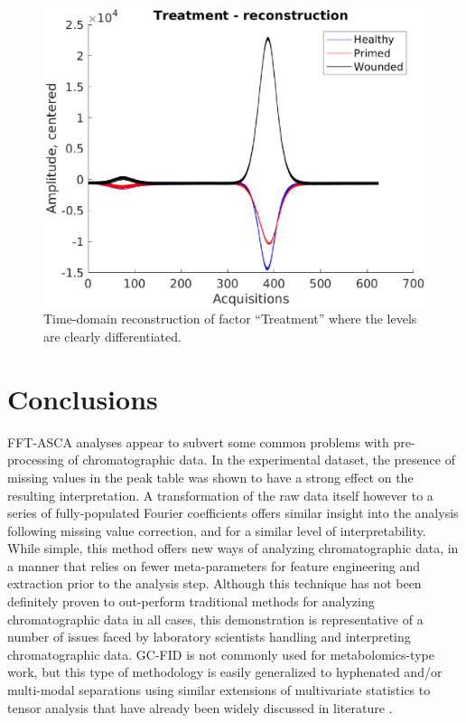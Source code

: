 \documentclass[preprint,12pt]{elsarticle}
\begin{document}
\begin{figure}[hbt!]
    \centering
    \includegraphics[width=0.9\linewidth]{time_treat.eps}
    \caption{Time-domain reconstruction of factor ``Treatment'' where the levels are clearly differentiated.}
    \label{fig:freq_treat}
\end{figure}


\section{Conclusions}

FFT-ASCA analyses appear to subvert some common problems with pre-processing of chromatographic data. In the experimental dataset, the presence of missing values in the peak table was shown to have a strong effect on the resulting interpretation. A transformation of the raw data itself however to a series of fully-populated Fourier coefficients offers similar insight into the analysis following missing value correction, and for a similar level of interpretability. While simple, this method offers new ways of analyzing chromatographic data, in a manner that relies on fewer meta-parameters for feature engineering and extraction prior to the analysis step. Although this technique has not been definitely proven to out-perform traditional methods for analyzing chromatographic data in all cases, this demonstration is representative of a number of issues faced by laboratory scientists handling and interpreting chromatographic data. GC-FID is not commonly used for metabolomics-type work, but this type of methodology is easily generalized to hyphenated and/or multi-modal separations using similar extensions of multivariate statistics to tensor analysis that have already been widely discussed in literature \cite{koleini2023complementary}. 
\end{document}
